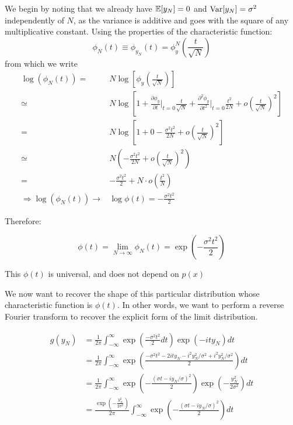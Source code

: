 \begin{example}

	We begin by noting that we already have $\mathbb{E}[y_N]=0$ and $\operatorname{Var}[y_N]=\sigma^2$ independently of $N$, as the variance is additive and goes with the square of any multiplicative constant. Using the properties of the characteristic function:
	\[
	\phi_N(t)\equiv \phi_{y_N}(t) = \phi_y^N\left(\frac{t}{\sqrt{N}} \right)
	\]
	from which we write
	\begin{align*}
		\log\left(\phi_N(t)\right) =& N\log\left[ \phi_y \left(\frac{t}{\sqrt{N}}\right) \right] \\
		\simeq& N\log\left[ 1 + \frac{\partial\phi_y}{\partial t}\bigg\vert_{t=0}\frac{t}{\sqrt{N}} + \frac{\partial^2\phi_y}{\partial t^2}\bigg\vert_{t=0}\frac{t^2}{2N} + o\left(\frac{t}{\sqrt{N}}\right)^2\right]\\
		=&N\log\left[1+0-\frac{\sigma^2t^2}{2N}+ o\left(\frac{t}{\sqrt{N}}\right)^2\right]\\
		\simeq& N \left(-\frac{\sigma^2t^2}{2N}+ o\left(\frac{t}{\sqrt{N}}\right)^2\right)\\
		=&-\frac{\sigma^2t^2}{2}+ N\cdot o\left(\frac{t^2}{N}\right)\\
		\Rightarrow\log\left(\phi_N(t)\right)\rightarrow&\log\phi(t)=-\frac{\sigma^2t^2}{2}
	\end{align*}
	
	Therefore:
	
	\[
	\phi(t) = \lim_{N\to\infty}\phi_N(t)=\exp\left(-\frac{\sigma^2t^2}{2}\right)
	\]
	
	This $\phi(t)$ is universal, and does not depend on $p(x)$
	
	We now want to recover the shape of this particular distribution whose characteristic function is $\phi(t)$. In other words, we want to perform a reverse Fourier transform to recover the explicit form of the limit distribution.
 
	\begin{align*}
		g(y_N)&=\frac{1}{2 \pi}\int_{-\infty}^{\infty}\exp\left(\frac{-\sigma^2t^2}{2}dt\right)\exp\left(-ity_N\right) dt\\
		&=\frac{1}{2 \pi}\int_{-\infty}^{\infty}\exp\left(\frac{-\sigma^2t^2-2ity_N-i^2y_N^2/ \sigma^2+i^2y_N^2/ \sigma^2}{2}\right) dt\\
		&=\frac{1}{2 \pi}\int_{-\infty}^{\infty}\exp\left(-\frac{\left(\sigma t -iy_N/\sigma \right)^2}{2}\right)\exp\left(-\frac{y_N^2}{2\sigma^2}\right) dt\\
		&=\frac{\exp\left(-\frac{y_N^2}{2\sigma^2}\right)}{2 \pi}\int_{-\infty}^{\infty}\exp\left(-\frac{\left(\sigma t -iy_N/\sigma \right)^2}{2}\right)dt
	\end{align*}



\end{example}
